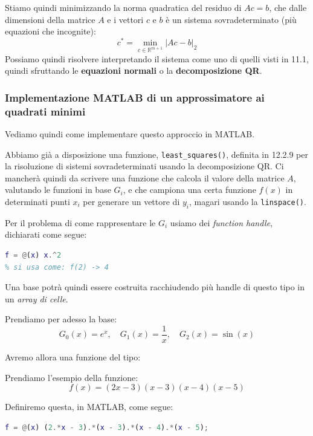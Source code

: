 \documentclass[a4paper,11pt]{article}
\begin{document}
Stiamo quindi minimizzando la norma quadratica del residuo di $Ac = b$, che dalle dimensioni della matrice $A$ e i vettori $c$ e $b$ è un sistema sovradeterminato (più equazioni che incognite):
$$
c^* = \min_{c \in \mathbb{R}^{m + 1}} |Ac - b|_2
$$
Possiamo quindi risolvere interpretando il sistema come uno di quelli visti in 11.1, quindi sfruttando le \textbf{equazioni normali} o la \textbf{decomposizione QR}.

\subsubsection{Implementazione MATLAB di un approssimatore ai quadrati minimi}
Vediamo quindi come implementare questo approccio in MATLAB.

\lstset{language=matlab, style=codestyle}

Abbiamo già a disposizione una funzione, \lstinline|least_squares()|, definita in 12.2.9 per la risoluzione di sistemi sovradeterminati usando la decomposizione QR.
Ci mancherà quindi da scrivere una funzione che calcola il valore della matrice $A$, valutando le funzioni in base $G_i$, e che campiona una certa funzione $f(x)$ in determinati punti $x_i$ per generare un vettore di $y_i$, magari usando la \lstinline|linspace()|.

Per il problema di come rappresentare le $G_i$ usiamo dei \textit{function handle}, dichiarati come segue:
\begin{lstlisting}[language=matlab, style=codestyle]	
% un function handle alla funzione f(x) = x^2
f = @(x) x.^2
% si usa come: f(2) -> 4
\end{lstlisting}
Una base potrà quindi essere costruita racchiudendo più handle di questo tipo in un \textit{array di celle}.

Prendiamo per adesso la base:
$$
G_0(x) = e^x, \quad G_1(x) = \frac{1}{x}, \quad G_2(x) = \sin(x)
$$

Avremo allora una funzione del tipo:


Prendiamo l'esempio della funzione:
$$
f\left(x\right)=\left(2x-3\right)\left(x-3\right)\left(x-4\right)\left(x-5\right)
$$

Definiremo questa, in MATLAB, come segue:
\begin{lstlisting}[language=matlab, style=codestyle]	
f = @(x) (2.*x - 3).*(x - 3).*(x - 4).*(x - 5);
\end{lstlisting}
\end{document}
